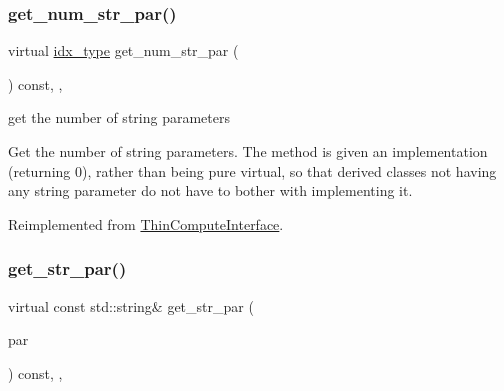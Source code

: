 \subsubsection{\texorpdfstring{get\+\_\+num\+\_\+str\+\_\+par()}{get\_num\_str\_par()}}
{\footnotesize\ttfamily virtual \mbox{\hyperlink{class_s_m_spp__di__unipi__it_1_1_thin_compute_interface_aa3d710629ad8c434286726ad810c3b47}{idx\+\_\+type}} get\+\_\+num\+\_\+str\+\_\+par (\begin{DoxyParamCaption}\item[{void}]{ }\end{DoxyParamCaption}) const\hspace{0.3cm}{\ttfamily [inline]}, {\ttfamily [override]}, {\ttfamily [virtual]}}



get the number of string parameters 

Get the number of string parameters. The method is given an implementation (returning 0), rather than being pure virtual, so that derived classes not having any string parameter do not have to bother with implementing it. 

Reimplemented from \mbox{\hyperlink{class_s_m_spp__di__unipi__it_1_1_thin_compute_interface_a23ef8ba7477625aec4a54dddff053468}{Thin\+Compute\+Interface}}.

\mbox{\label{class_s_m_spp__di__unipi__it_1_1_f_row_constraint_a3e17318e51ccc01da85e2627b810d6a7}} 
\subsubsection{\texorpdfstring{get\+\_\+str\+\_\+par()}{get\_str\_par()}}
{\footnotesize\ttfamily virtual const std\+::string\& get\+\_\+str\+\_\+par (\begin{DoxyParamCaption}\item[{const \mbox{\hyperlink{class_s_m_spp__di__unipi__it_1_1_thin_compute_interface_aa3d710629ad8c434286726ad810c3b47}{idx\+\_\+type}}}]{par }\end{DoxyParamCaption}) const\hspace{0.3cm}{\ttfamily [inline]}, {\ttfamily [override]}, {\ttfamily [virtual]}}



